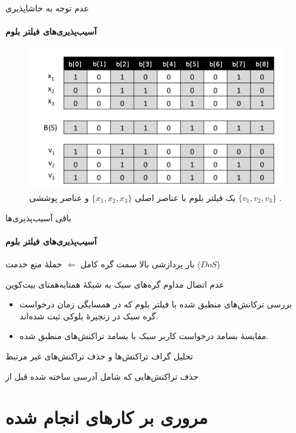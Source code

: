 \documentclass{beamer}
\begin{document}
\begin{frame}{عدم توجه به حاشاپذیری}
	\framesubtitle{آسیب‌پذیری‌های فیلتر بلوم}
	
	\begin{figure}
		\centering
		\includegraphics[width=0.7\linewidth]{images/gamma_deniability}
		\caption{%
			یک فیلتر بلوم با عناصر اصلی $\{x_1, x_2, x_3\}$ و عناصر پوششی $\{v_1, v_2, v_3\}$ \cite{Bianchi2012}.}
		\label{fig:gammadeniability}
	\end{figure}
	
\end{frame}

\begin{frame}{باقی آسیب‌پذیری‌ها}
	\framesubtitle{آسیب‌پذیری‌های فیلتر بلوم}
	\begin{enumerate}
		\item {%
		بار پردازشی بالا سمت گره کامل $\Leftarrow$ حملهٔ منع خدمت ($DoS$)} 
		\item {%
		عدم اتصال مداوم گره‌های سبک به شبکهٔ همتا‌به‌همتای بیت‌کوین
			\begin{itemize}
				\item{%
			بررسی ترکانش‌های منطبق شده با فیلتر بلوم که در همسایگی زمان درخواست گره سبک در زنجیرهٔ بلوکی ثبت شده‌اند.}
				\item{%
			مقایسهٔ بسامد درخواست کاربر سبک با بسامد تراکنش‌های منطبق شده.
			}
			\end{itemize}	
		\item {%
		تحلیل گراف تراکنش‌ها و حذف تراکنش‌های غیر مرتبط
		}
		\item {%
		حذف تراکنش‌هایی که شامل آدرسی ساخته شده قبل از  }
}
	\end{enumerate}
\end{frame}

\section{مروری بر کار‌های انجام شده\hfill}
\end{document}
